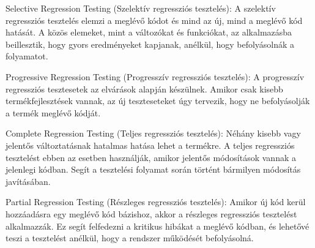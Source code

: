 \noindent

Selective Regression Testing (Szelektív regressziós tesztelés):
A szelektív regressziós tesztelés elemzi a meglévő kódot és mind az új, mind a meglévő kód hatását.
A közös elemeket, mint a változókat és funkciókat, az alkalmazásba beillesztik, hogy gyors eredményeket kapjanak, anélkül, hogy befolyásolnák a folyamatot.

\noindent

Progressive Regression Testing (Progresszív regressziós tesztelés):
A progresszív regressziós tesztesetek az elvárások alapján készülnek.
Amikor csak kisebb termékfejlesztések vannak, az új teszteseteket úgy tervezik, hogy ne befolyásolják a termék meglévő kódját.

\noindent

Complete Regression Testing  (Teljes regressziós tesztelés):
Néhány kisebb vagy jelentős változtatásnak hatalmas hatása lehet a termékre.
A teljes regressziós tesztelést ebben az esetben használják, amikor jelentős módosítások vannak a jelenlegi kódban.
Segít a tesztelési folyamat során történt bármilyen módosítás javításában.

\noindent

Partial Regression Testing (Részleges regressziós tesztelés):
Amikor új kód kerül hozzáadásra egy meglévő kód bázishoz, akkor a részleges regressziós tesztelést alkalmazzák.
Ez segít felfedezni a kritikus hibákat a meglévő kódban, és lehetővé teszi a tesztelést anélkül, hogy a rendszer működését befolyásolná.
